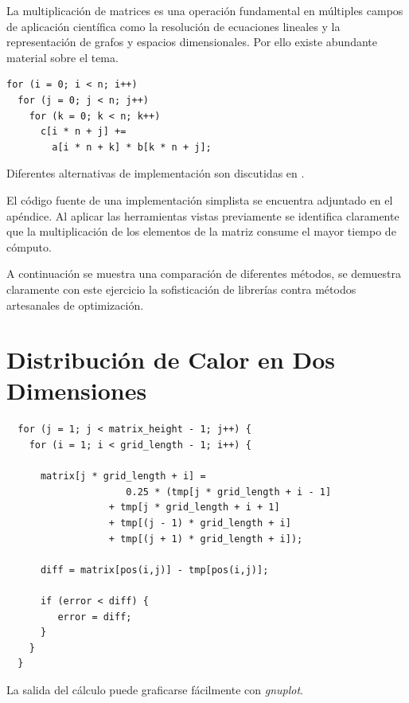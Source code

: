 \documentclass[a4paper]{report}
\begin{document}
La multiplicaci\'on de matrices es una operaci\'on fundamental en m\'ultiples
campos de aplicaci\'on cient\'ifica como la resoluci\'on de ecuaciones
lineales y la representaci\'on de grafos y espacios dimensionales. Por ello
existe abundante material sobre el tema.

\begin{verbatim}
for (i = 0; i < n; i++)
  for (j = 0; j < n; j++)
    for (k = 0; k < n; k++)
      c[i * n + j] += 
        a[i * n + k] * b[k * n + j];
\end{verbatim}

Diferentes alternativas de implementaci\'on son discutidas en
\cite{mm-matrixmultiplicationtool}.

\bigskip

El c\'odigo fuente de una implementaci\'on simplista se encuentra adjuntado en
el ap\'endice. Al aplicar las herramientas vistas previamente se identifica
claramente que la multiplicaci\'on de los elementos de la matriz consume el
mayor tiempo de c\'omputo.

\bigskip



\bigskip

A continuaci\'on se muestra una comparaci\'on de diferentes m\'etodos, se
demuestra claramente con este ejercicio la sofisticaci\'on de librer\'ias
contra m\'etodos artesanales de optimizaci\'on.

\section{Distribuci\'on de Calor en Dos Dimensiones}

\begin{verbatim}
  for (j = 1; j < matrix_height - 1; j++) {
    for (i = 1; i < grid_length - 1; i++) {
      
      matrix[j * grid_length + i] = 
                     0.25 * (tmp[j * grid_length + i - 1]
                  + tmp[j * grid_length + i + 1]
                  + tmp[(j - 1) * grid_length + i]
                  + tmp[(j + 1) * grid_length + i]);

      diff = matrix[pos(i,j)] - tmp[pos(i,j)];

      if (error < diff) {
         error = diff;
      }
    }
  }
\end{verbatim}

La salida del c\'alculo puede graficarse f\'acilmente con {\it gnuplot}.
\end{document}
